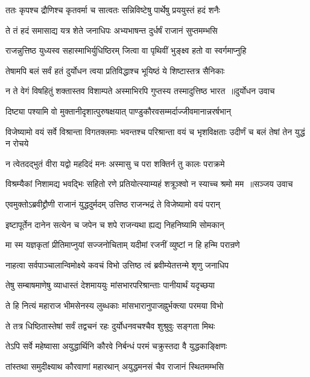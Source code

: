 \twolineshloka
{ततः कृपश्च द्रौणिश्च कृतवर्मा च सात्वतः}
{सन्निविष्टेषु पार्थेषु प्रययुस्तं हदं शनैः}


\twolineshloka
{ते तं हदं समासाद्य यत्र शेते जनाधिपः}
{अभ्यभाषन्त दुर्धर्षं राजानं सुप्तमम्भसि}


\twolineshloka
{राजन्नुत्तिष्ठ युध्यस्व सहास्माभिर्युधिष्ठिरम्}
{जित्वा वा पृथिवीं भुङ्क्ष्व हतो वा स्वर्गमाप्नुहि}


\twolineshloka
{तेषामपि बलं सर्वं हतं दुर्योधन त्वया}
{प्रतिविद्धाश्च भूयिष्ठं ये शिष्टास्तत्र सैनिकाः}


\threelineshloka
{न ते वेगं विषहितुं शक्तास्तव विशाम्पते}
{अस्माभिरपि गुप्तस्य तस्मादुत्तिष्ठ भारत ॥दुर्योधन उवाच}
{}


\twolineshloka
{दिष्ट्या पश्यामि वो मुक्तानीदृशात्पुरुषक्षयात्}
{पाण्डुकौरवसम्मर्दाज्जीवमानान्नरर्षभान्}


\threelineshloka
{विजेष्यामो वयं सर्वे विश्रान्ता विगतक्लमाः}
{भवन्तश्च परिश्रान्ता वयं च भृशविक्षताः}
{उदीर्णं च बलं तेषां तेन युद्धं न रोचये}


\twolineshloka
{न त्वेतदद्भुतं वीरा यद्वो महदिदं मनः}
{अस्मासु च परा शक्तिर्न तु कालः पराक्रमे}


\threelineshloka
{विश्रम्यैकां निशामद्य भवद्भिः सहितो रणे}
{प्रतियोत्स्याम्यहं शत्रूञ्श्वो न स्याच्च श्रमो मम ॥सञ्जय उवाच}
{}


\twolineshloka
{एवमुक्तोऽब्रवीद्द्रौणी राजानं युद्धदुर्मदम्}
{उत्तिष्ठ राजन्भद्रं ते विजेष्यामो वयं परान्}


\twolineshloka
{इष्टापूर्तेन दानेन सत्येन च जपेन च}
{शपे राजन्यथा ह्यद्य निहनिष्यामि सोमकान्}


\twolineshloka
{मा स्म यज्ञकृतां प्रीतिमाप्नुयां सज्जनोचिताम्}
{यदीमां रजनीं व्युष्टां न हि हन्मि परान्रणे}


\twolineshloka
{नाहत्वा सर्वपाञ्चालान्विमोक्ष्ये कवचं विभो}
{उत्तिष्ठ त्वं ब्रवीम्येतत्तन्मे शृणु जनाधिप}


\twolineshloka
{तेषु सम्बाषमाणेषु व्याधास्तं देशमाययुः}
{मांसभारपरिश्रान्ताः पानीयार्थं यदृच्छया}


\twolineshloka
{ते हि नित्यं महाराज भीमसेनस्य लुब्धकाः}
{मांसभारानुपाजह्नुर्भक्त्या परमया विभो}


\twolineshloka
{ते तत्र धिष्ठितास्तेषां सर्वं तद्वचनं रहः}
{दुर्योधनवचश्चैव शुश्रुवुः सङ्गता मिथः}


\twolineshloka
{तेऽपि सर्वे महेष्वासा अयुद्धार्थिनि कौरवे}
{निर्बन्धं परमं चक्रुस्तदा वै युद्धकाङ्क्षिणः}


\twolineshloka
{तांस्तथा समुदीक्ष्याथ कौरवाणां महारथान्}
{अयुद्धमनसं चैव राजानं स्थितमम्भसि}


